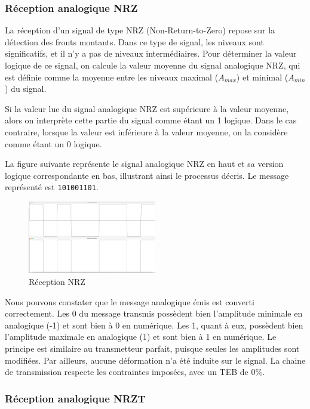\subsubsection{Réception analogique NRZ}

La réception d'un signal de type NRZ (Non-Return-to-Zero) repose sur la détection des fronts montants. Dans ce type de signal, les niveaux sont significatifs, et il n'y a pas de niveaux intermédiaires. Pour déterminer la valeur logique de ce signal, on calcule la valeur moyenne du signal analogique NRZ, qui est définie comme la moyenne entre les niveaux maximal ($A_{max}$) et minimal ($A_{min}$) du signal.

Si la valeur lue du signal analogique NRZ est supérieure à la valeur moyenne, alors on interprète cette partie du signal comme étant un 1 logique. Dans le cas contraire, lorsque la valeur est inférieure à la valeur moyenne, on la considère comme étant un 0 logique.

La figure suivante représente le signal analogique NRZ en haut et sa version logique correspondante en bas, illustrant ainsi le processus décris. Le message représenté est \texttt{101001101}.

\begin{figure}[H]
    \centering
    \includegraphics[width=0.5\textwidth]{img/etape2_reception_NRZ.png}
    \caption{Réception NRZ}
    \label{fig:reception_nrz}
\end{figure}

Nous pouvons constater que le message analogique émis est converti correctement. Les 0 du message transmis possèdent bien l'amplitude minimale en analogique (-1) et sont bien à 0 en numérique. Les 1, quant à eux, possèdent bien l'amplitude maximale en analogique (1) et sont bien à 1 en numérique. Le principe est similaire au transmetteur parfait, puisque seules les amplitudes sont modifiées. Par ailleurs, aucune déformation n'a été induite sur le signal. La chaine de transmission respecte les contraintes imposées, avec un TEB de 0\%.

\subsubsection{Réception analogique NRZT}


